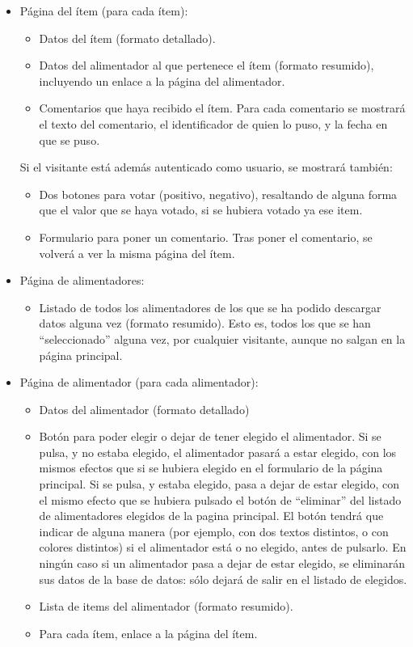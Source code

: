 \begin{itemize}
  \item Página del ítem (para cada ítem):

    \begin{itemize}
    \item Datos del ítem (formato detallado).
    \item Datos del alimentador al que pertenece el ítem (formato resumido), incluyendo un enlace a la página del alimentador.
    \item Comentarios que haya recibido el ítem. Para cada comentario se mostrará el texto del comentario, el identificador de quien lo puso, y la fecha en que se puso.
    \end{itemize}

    Si el visitante está además autenticado como usuario, se mostrará también:

    \begin{itemize}
    \item Dos botones para votar (positivo, negativo), resaltando de alguna forma que el valor que se haya votado, si se hubiera votado ya ese item.
    \item Formulario para poner un comentario. Tras poner el comentario, se volverá a ver la misma página del ítem.
    \end{itemize}

  \item Página de alimentadores:

    \begin{itemize}
    \item Listado de todos los alimentadores de los que se ha podido descargar datos alguna vez (formato resumido). Esto es, todos los que se han ``seleccionado'' alguna vez, por cualquier visitante, aunque no salgan en la página principal.
    \end{itemize}
    
  \item Página de alimentador (para cada alimentador):

    \begin{itemize}
    \item Datos del alimentador (formato detallado)
    \item Botón para poder elegir o dejar de tener elegido el alimentador. Si se pulsa, y no estaba elegido, el alimentador pasará a estar elegido, con los mismos efectos que si se hubiera elegido en el formulario de la página principal. Si se pulsa, y estaba elegido, pasa a dejar de estar elegido, con el mismo efecto que se hubiera pulsado el botón de ``eliminar'' del listado de alimentadores elegidos de la pagina principal. El botón tendrá que indicar de alguna manera (por ejemplo, con dos textos distintos, o con colores distintos) si el alimentador está o no elegido, antes de pulsarlo. En ningún caso si un alimentador pasa a dejar de estar elegido, se eliminarán sus datos de la base de datos: sólo dejará de salir en el listado de elegidos.
    \item Lista de items del alimentador (formato resumido).
    \item Para cada ítem, enlace a la página del ítem.
    \end{itemize}


\end{itemize}
